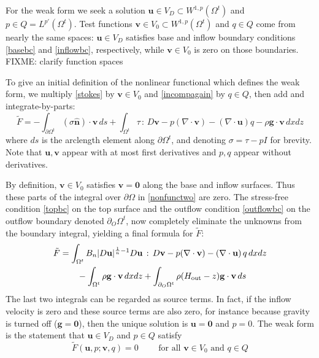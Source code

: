 \documentclass[letterpaper,final,12pt,reqno]{amsart}
\newcommand{\hbn}{\hat{\mathbf{n}}}
\newcommand{\bg}{\mathbf{g}}
\newcommand{\bu}{\mathbf{u}}
\newcommand{\bv}{\mathbf{v}}
\newcommand{\bzero}{\bm{0}}
\begin{document}
For the weak form we seek a solution $\bu\in V_D \subset W^{1,p}(\Omega^t)$ and $p \in Q=L^{p'}(\Omega^t)$.  Test functions $\bv\in V_0 \subset W^{1,p}(\Omega^t)$ and $q\in Q$ come from nearly the same spaces: $\bu\in V_D$ satisfies base and inflow boundary conditions \eqref{basebc} and \eqref{inflowbc}, respectively, while $\bv\in V_0$ is zero on those boundaries.  FIXME: clarify function spaces

To give an initial definition of the nonlinear functional which defines the weak form, we multiply \eqref{stokes} by $\bv\in V_0$ and \eqref{incompagain} by $q\in Q$, then add and integrate-by-parts:
\begin{equation}
\tilde F = -\int_{\partial\Omega^t} (\sigma \hbn)\cdot \bv\,ds + \int_{\Omega^t} \tau \,:\,D\bv - p (\nabla \cdot \bv) - \left(\nabla \cdot \bu\right) q - \rho \mathbf{g} \cdot \bv \,dx dz \label{nonfunctwo}
\end{equation}
where $ds$ is the arclength element along $\partial\Omega^t$, and denoting $\sigma=\tau-pI$ for brevity.  Note that $\bu,\bv$ appear with at most first derivatives and $p,q$ appear without derivatives.

By definition, $\bv\in V_0$ satisfies $\bv=\bzero$ along the base and inflow surfaces.  Thus these parts of the integral over $\partial\Omega$ in \eqref{nonfunctwo} are zero.  The stress-free condition \eqref{topbc} on the top surface and the outflow condition \eqref{outflowbc} on the outflow boundary denoted $\partial_O \Omega^t$, now completely eliminate the unknowns from the boundary integral, yielding a final formula for $\tilde F$:
\begin{align}
\tilde F &= \int_{\Omega^t} B_n |D\bu|^{\frac{1}{n} - 1} D\bu\,:\,D\bv - p (\nabla \cdot \bv) - \left(\nabla \cdot \bu\right) q \,dx dz \label{defineF} \\
    &\qquad  - \int_{\Omega^t} \rho \mathbf{g} \cdot \bv \,dx dz + \int_{\partial_O \Omega^t} \rho (H_{\text{out}}-z) \bg \cdot \bv \,ds \notag
\end{align}
The last two integrals can be regarded as source terms.  In fact, if the inflow velocity is zero and these source terms are also zero, for instance because gravity is turned off ($\bg=\bzero$), then the unique solution is $\bu=\bzero$ and $p=0$.  The weak form is the statement that $\bu\in V_D$ and $p\in Q$ satisfy
\begin{equation}
\tilde F(\bu,p;\bv,q) = 0 \qquad \text{ for all } \bv\in V_0 \text{ and } q\in Q  \label{weak}
\end{equation}
\end{document}
